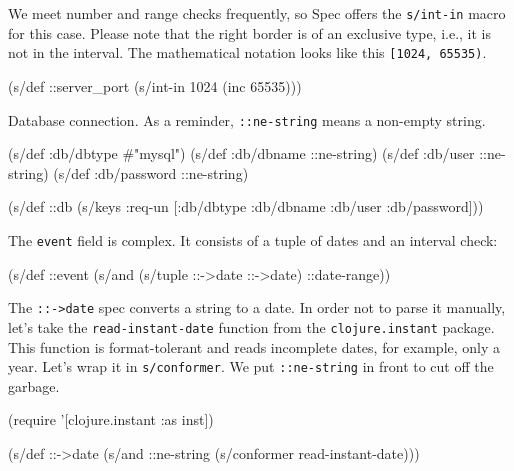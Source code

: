 
We meet number and range checks frequently, so Spec offers the \verb|s/int-in| macro for this case. Please note that the right border is of an exclusive type, i.e., it is not in the interval. The mathematical notation looks like this \verb|[1024, 65535)|.

\begin{clojure}
(s/def ::server_port
  (s/int-in 1024 (inc 65535)))
\end{clojure}


\noindent
Database connection. As a reminder, \verb|::ne-string| means a non-empty string.

\begin{clojure}
(s/def :db/dbtype   #{"mysql"})
(s/def :db/dbname   ::ne-string)
(s/def :db/user     ::ne-string)
(s/def :db/password ::ne-string)

(s/def ::db
  (s/keys :req-un [:db/dbtype
                   :db/dbname
                   :db/user
                   :db/password]))
\end{clojure}

The \verb|event| field is complex. It consists of a tuple of dates and an interval check:

\begin{clojure}
(s/def ::event
  (s/and (s/tuple ::->date ::->date)
         ::date-range))
\end{clojure}


The \verb|::->date| spec converts a string to a date. In order not to parse it manually, let's take the \verb|read-instant-date| function from the \verb|clojure.instant| package. This function is format-tolerant and reads incomplete dates, for example, only a year. Let's wrap it in \verb|s/conformer|. We put \verb|::ne-string| in front to cut off the garbage.


\ifx\DEVICETYPE\MOBILE

\begin{clojure}
(require '[clojure.instant :as inst])

(s/def ::->date
  (s/and ::ne-string
    (s/conformer read-instant-date)))
\end{clojure}

